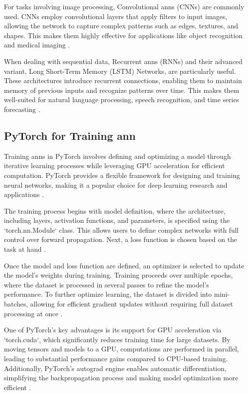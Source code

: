 For tasks involving image processing, Convolutional \ac{ann}s (CNNs) are commonly used.
CNNs employ convolutional layers that apply filters to input images, allowing the network to capture complex patterns such as edges, textures, and shapes.
This makes them highly effective for applications like object recognition and medical imaging \cite{o2015introduction}.

When dealing with sequential data, Recurrent \ac{ann}s (RNNs) and their advanced variant, Long Short-Term Memory (LSTM) Networks, are particularly useful.
These architectures introduce recurrent connections, enabling them to maintain memory of previous inputs and recognize patterns over time.
This makes them well-suited for natural language processing, speech recognition, and time series forecasting \cite{medsker2001recurrent}.

\subsection{PyTorch for Training \ac{ann}} \label{sec:pytorch}

Training \ac{ann}s in PyTorch involves defining and optimizing a model through iterative learning processes while leveraging GPU acceleration for efficient computation.
PyTorch provides a flexible framework for designing and training neural networks, making it a popular choice for deep learning research and applications \cite{pytorchPyTorch}.

The training process begins with model definition, where the architecture, including layers, activation functions, and parameters, is specified using the `torch.nn.Module` class.
This allows users to define complex networks with full control over forward propagation.
Next, a loss function is chosen based on the task at hand \cite{pytorchPyTorch}.

Once the model and loss function are defined, an optimizer is selected to update the model’s weights during training.
Training proceeds over multiple epochs, where the dataset is processed in several passes to refine the model’s performance.
To further optimize learning, the dataset is divided into mini-batches, allowing for efficient gradient updates without requiring full dataset processing at once \cite{pytorchPyTorch}.

One of PyTorch’s key advantages is its support for GPU acceleration via `torch.cuda`, which significantly reduces training time for large datasets.
By moving tensors and models to a GPU, computations are performed in parallel, leading to substantial performance gains compared to CPU-based training.
Additionally, PyTorch's autograd engine enables automatic differentiation, simplifying the backpropagation process and making model optimization more efficient \cite{pytorchPyTorch}.

